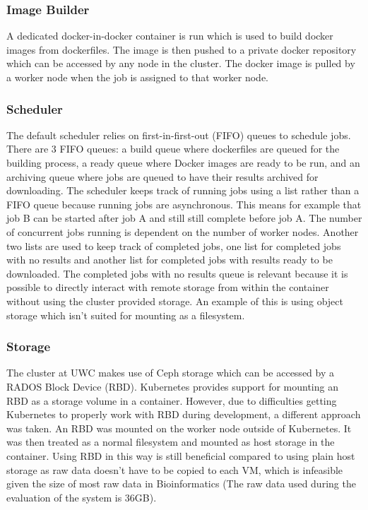 \documentclass{sig-alternate-05-2015}
\begin{document}
\subsubsection{Image Builder}
A dedicated docker-in-docker container is run which is used to build docker images from dockerfiles. The image is then pushed to a private docker repository which can be accessed by any node in the cluster. The docker image is pulled by a worker node when the job is assigned to that worker node.

\subsubsection{Scheduler}
The default scheduler relies on first-in-first-out (FIFO) queues to schedule jobs. There are 3 FIFO queues: a build queue where dockerfiles are queued for the building process, a ready queue where Docker images are ready to be run, and an archiving queue where jobs are queued to have their results archived for downloading. The scheduler keeps track of running jobs using a list rather than a FIFO queue because running jobs are asynchronous. This means for example that job B can be started after job A and still still complete before job A. The number of concurrent jobs running is dependent on the number of worker nodes. Another two lists are used to keep track of completed jobs, one list for completed jobs with no results and another list for completed jobs with results ready to be downloaded. The completed jobs with no results queue is relevant because it is possible to directly interact with remote storage from within the container without using the cluster provided storage. An example of this is using object storage which isn't suited for mounting as a filesystem.

\subsubsection{Storage}
The cluster at UWC makes use of Ceph storage which can be accessed by a RADOS Block Device (RBD). Kubernetes provides support for mounting an RBD as a storage volume in a container. However, due to difficulties getting Kubernetes to properly work with RBD during development, a different approach was taken. An RBD was mounted on the worker node outside of Kubernetes. It was then treated as a normal filesystem and mounted as host storage in the container. Using RBD in this way is still beneficial compared to using plain host storage as raw data doesn't have to be copied to each VM, which is infeasible given the size of most raw data in Bioinformatics (The raw data used during the evaluation of the system is 36GB).
\end{document}
